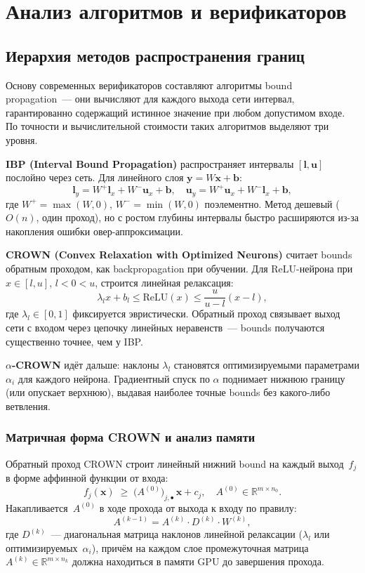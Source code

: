 \section{Анализ алгоритмов и верификаторов}

\subsection{Иерархия методов распространения границ}

Основу современных верификаторов составляют алгоритмы bound
propagation~--- они вычисляют для каждого выхода сети интервал,
гарантированно содержащий истинное значение при любом допустимом входе.
По точности и вычислительной стоимости таких алгоритмов выделяют
три уровня.

\textbf{IBP (Interval Bound Propagation)} распространяет интервалы
$[\mathbf{l}, \mathbf{u}]$ послойно через сеть.
Для линейного слоя $\mathbf{y} = W\mathbf{x} + \mathbf{b}$:
$$\mathbf{l}_y = W^+\mathbf{l}_x + W^-\mathbf{u}_x + \mathbf{b}, \quad
  \mathbf{u}_y = W^+\mathbf{u}_x + W^-\mathbf{l}_x + \mathbf{b},$$
где $W^+ = \max(W, 0)$, $W^- = \min(W, 0)$ поэлементно.
Метод дешевый ($O(n)$, один проход), но с ростом глубины интервалы
быстро расширяются из-за накопления ошибки овер-аппроксимации.\cite{CROWNPaper}

\textbf{CROWN (Convex Relaxation with Optimized Neurons)} считает
bounds обратным проходом, как backpropagation при обучении.
Для ReLU-нейрона при $x \in [l, u]$, $l < 0 < u$, строится линейная
релаксация:
$$\lambda_l x + b_l \leq \mathrm{ReLU}(x) \leq \frac{u}{u - l}(x - l),$$
где $\lambda_l \in [0, 1]$ фиксируется эвристически.
Обратный проход связывает выход сети с входом через цепочку линейных
неравенств~--- bounds получаются существенно точнее, чем у IBP.\cite{CROWNPaper}

\textbf{$\alpha$-CROWN} идёт дальше: наклоны $\lambda_l$ становятся
оптимизируемыми параметрами $\alpha_i$ для каждого нейрона.
Градиентный спуск по $\alpha$ поднимает нижнюю границу (или опускает
верхнюю), выдавая наиболее точные bounds без какого-либо
ветвления.\cite{AlphaBetaCrownVNNCOMP23}

\subsubsection{Матричная форма CROWN и анализ памяти}
\label{sec:crown-memory}

Обратный проход CROWN строит линейный нижний bound на каждый
выход~$f_j$ в форме аффинной функции от входа:
$$f_j(\mathbf{x}) \;\geq\; \bigl(A^{(0)}\bigr)_{j,\bullet}\,\mathbf{x} + c_j,
  \quad A^{(0)} \in \mathbb{R}^{m \times n_0}.$$
Накапливается~$A^{(0)}$ в ходе прохода от выхода к входу по правилу:
$$A^{(k-1)} = A^{(k)} \cdot D^{(k)} \cdot W^{(k)},$$
где $D^{(k)}$~--- диагональная матрица наклонов линейной релаксации
($\lambda_l$ или оптимизируемых~$\alpha_i$), причём на каждом слое
промежуточная матрица $A^{(k)} \in \mathbb{R}^{m \times n_k}$ должна
находиться в памяти GPU до завершения прохода.

